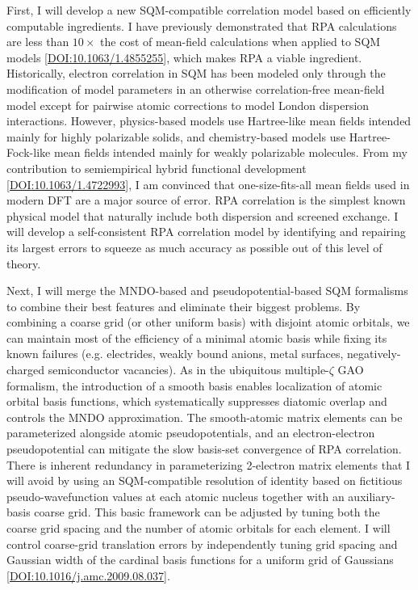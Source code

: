 \documentclass[12pt]{article}
\begin{document}
First, I will develop a new SQM-compatible correlation model based on efficiently computable ingredients.
I have previously demonstrated that RPA calculations are less than $10\times$ the cost of mean-field calculations
 when applied to SQM models [\href{https://doi.org/10.1063/1.4855255}{DOI:10.1063/1.4855255}], which makes RPA a viable ingredient.
Historically, electron correlation in SQM has been modeled only through the modification of model parameters in an otherwise correlation-free mean-field model
 except for pairwise atomic corrections to model London dispersion interactions.
However, physics-based models use Hartree-like mean fields intended mainly for highly polarizable solids,
 and chemistry-based models use Hartree-Fock-like mean fields intended mainly for weakly polarizable molecules.
From my contribution to semiempirical hybrid functional development [\href{https://doi.org/10.1063/1.4722993}{DOI:10.1063/1.4722993}],
 I am convinced that one-size-fits-all mean fields used in modern DFT are a major source of error.
RPA correlation is the simplest known physical model that naturally include both dispersion and screened exchange.
I will develop a self-consistent RPA correlation model by identifying and repairing its largest errors to squeeze as much accuracy as possible out of this level of theory.

Next, I will merge the MNDO-based and pseudopotential-based SQM formalisms to combine their best features and eliminate their biggest problems.
By combining a coarse grid (or other uniform basis) with disjoint atomic orbitals, we can maintain most of the efficiency of a minimal atomic basis
 while fixing its known failures (e.g. electrides, weakly bound anions, metal surfaces, negatively-charged semiconductor vacancies).
As in the ubiquitous multiple-$\zeta$ GAO formalism, the introduction of a smooth basis enables localization of atomic orbital basis functions,
 which systematically suppresses diatomic overlap and controls the MNDO approximation.
The smooth-atomic matrix elements can be parameterized alongside atomic pseudopotentials,
 and an electron-electron pseudopotential can mitigate the slow basis-set convergence of RPA correlation.
There is inherent redundancy in parameterizing 2-electron matrix elements that I will avoid by using an SQM-compatible
 resolution of identity based on fictitious pseudo-wavefunction values at each atomic nucleus together with an auxiliary-basis coarse grid.
This basic framework can be adjusted by tuning both the coarse grid spacing and the number of atomic orbitals for each element.
I will control coarse-grid translation errors by independently tuning grid spacing and Gaussian width
 of the cardinal basis functions for a uniform grid of Gaussians [\href{https://doi.org/10.1016/j.amc.2009.08.037}{DOI:10.1016/j.amc.2009.08.037}].
\end{document}
